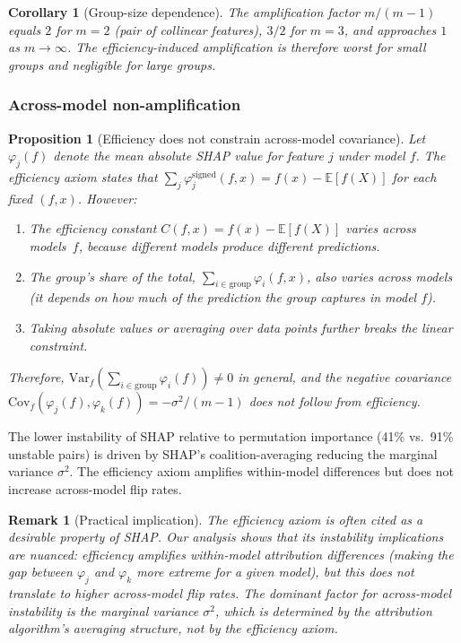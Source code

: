 \documentclass{article}
\newtheorem{corollary}[theorem]{Corollary}
\newtheorem{proposition}[theorem]{Proposition}
\newtheorem{remark}[theorem]{Remark}
\begin{document}
\begin{corollary}[Group-size dependence]
\label{cor:groupsize}
The amplification factor $m/(m-1)$ equals $2$ for $m=2$ (pair of
collinear features), $3/2$ for $m=3$, and approaches $1$ as
$m \to \infty$.  The efficiency-induced amplification is therefore
worst for small groups and negligible for large groups.
\end{corollary}

\subsubsection{Across-model non-amplification}

\begin{proposition}[Efficiency does not constrain across-model covariance]
\label{prop:no-across-model}
Let $\varphi_j(f)$ denote the mean absolute SHAP value for feature $j$
under model $f$.  The efficiency axiom states that
$\sum_j \varphi_j^{\mathrm{signed}}(f,x) = f(x) - \mathbb{E}[f(X)]$
for each fixed $(f,x)$.  However:
\begin{enumerate}
\item The efficiency constant $C(f,x) = f(x) - \mathbb{E}[f(X)]$
  \emph{varies across models}~$f$, because different models produce
  different predictions.
\item The group's share of the total,
  $\sum_{i \in \text{group}} \varphi_i(f,x)$, also varies across
  models (it depends on how much of the prediction the group captures
  in model $f$).
\item Taking absolute values or averaging over data points further
  breaks the linear constraint.
\end{enumerate}
Therefore, $\mathrm{Var}_f(\sum_{i \in \text{group}} \varphi_i(f))
\neq 0$ in general, and the negative covariance
$\mathrm{Cov}_f(\varphi_j(f), \varphi_k(f)) = -\sigma^2/(m-1)$
does \emph{not} follow from efficiency.
\end{proposition}

The lower instability of SHAP relative to permutation importance (41\% vs.\ 91\% unstable pairs) is driven by SHAP's coalition-averaging reducing the marginal variance $\sigma^2$. The efficiency axiom amplifies within-model differences but does not increase across-model flip rates.

\begin{remark}[Practical implication]
The efficiency axiom is often cited as a desirable property of SHAP.
Our analysis shows that its instability implications are nuanced:
efficiency amplifies within-model attribution differences (making the
gap between $\varphi_j$ and $\varphi_k$ more extreme for a given model),
but this does not translate to higher across-model flip rates.  The
dominant factor for across-model instability is the marginal variance
$\sigma^2$, which is determined by the attribution algorithm's
averaging structure, not by the efficiency axiom.
\end{remark}
\end{document}

